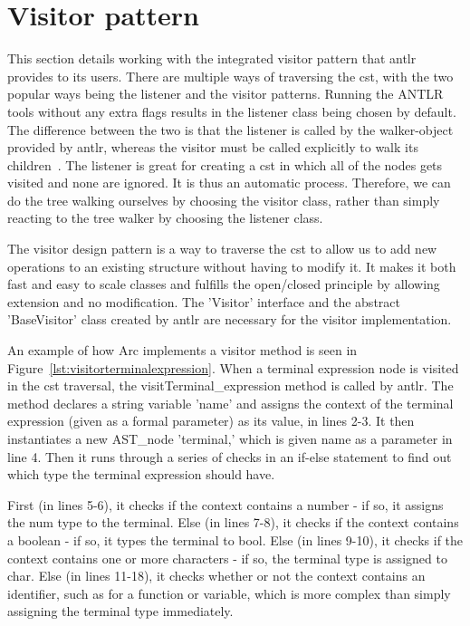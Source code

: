 \section{Visitor pattern}\label{sec:visitorpattern}
This section details working with the integrated visitor pattern that \gls{antlr} provides to its users. There are multiple ways of traversing the \gls{cst}, with the two popular ways being the listener and the visitor patterns. Running the ANTLR tools without any extra flags results in the listener class being chosen by default. The difference between the two is that the listener is called by the walker-object provided by \gls{antlr}, whereas the visitor must be called explicitly to walk its children~\cite{Parr2014}. The listener is great for creating a \gls{cst} in which all of the nodes gets visited and none are ignored. It is thus an automatic process. Therefore, we can do the tree walking ourselves by choosing the visitor class, rather than simply reacting to the tree walker by choosing the listener class.

The visitor design pattern is a way to traverse the \gls{cst} to allow us to add new operations to an existing structure without having to modify it. It makes it both fast and easy to scale classes and fulfills the open/closed principle by allowing extension and no modification. The 'Visitor' interface and the abstract 'BaseVisitor' class created by \gls{antlr} are necessary for the visitor implementation.

An example of how Arc implements a visitor method is seen in Figure~\ref{lst:visitorterminalexpression}. When a terminal expression node is visited in the \gls{cst} traversal, the visitTerminal\_expression method is called by \gls{antlr}. The method declares a string variable 'name' and assigns the context of the terminal expression (given as a formal parameter) as its value, in lines 2-3. It then instantiates a new AST\_node 'terminal,' which is given name as a parameter in line 4. Then it runs through a series of checks in an if-else statement to find out which type the terminal expression should have.

First (in lines 5-6), it checks if the context contains a number - if so, it assigns the num type to the terminal. Else (in lines 7-8), it checks if the context contains a boolean - if so, it types the terminal to bool. Else (in lines 9-10), it checks if the context contains one or more characters - if so, the terminal type is assigned to char. Else (in lines 11-18), it checks whether or not the context contains an identifier, such as for a function or variable, which is more complex than simply assigning the terminal type immediately.

